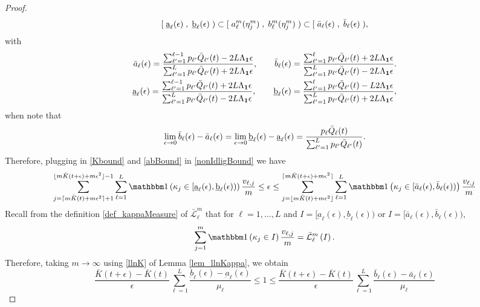 \documentclass{article}
\theoremstyle{definition}
\numberwithin{equation}{section}
\begin{document}
\begin{proof}
\begin{equation}
[\;\underbar a_\ell(\epsilon)\;,\;\underbar b_\ell(\epsilon)\;) \subset [\;a^m_\ell(\eta^m_j)\;,\;b^m_\ell(\eta^m_j)\;) \subset [\;\bar a_\ell(\epsilon)\;,\;\bar b_\ell(\epsilon)\;),
\end{equation}
with
\begin{align*}
  \bar a_\ell(\epsilon)= \frac{\sum_{\ell'=1}^{\ell-1 }\weight_{\ell'}\bar Q_{\ell'}(t)-2L\Lip_\f1\epsilon}{\sum_{\ell'=1}^{L}\weight_{\ell'}\bar Q_{\ell'}(t)+2L\Lip_\f1\epsilon},\quad\quad \bar b_\ell(\epsilon)= \frac{\sum_{\ell'=1}^{\ell }\weight_{\ell'}\bar Q_{\ell'}(t)+2L\Lip_\f1\epsilon}{\sum_{\ell'=1}^{L}\weight_{\ell'}\bar Q_{\ell'}(t)-2L\Lip_\f1\epsilon}.\\
  \underbar a_\ell(\epsilon)= \frac{\sum_{\ell'=1}^{\ell-1 }\weight_{\ell'}\bar Q_{\ell'}(t)+2L\Lip_\f1\epsilon}{\sum_{\ell'=1}^{L}\weight_{\ell'}\bar Q_{\ell'}(t)-2L\Lip_\f1\epsilon},\quad\quad
  \underbar b_\ell(\epsilon)= \frac{\sum_{\ell'=1}^{\ell }\weight_{\ell'}\bar Q_{\ell'}(t)-L2\Lip_\f1\epsilon}{\sum_{\ell'=1}^{L}\weight_{\ell'}\bar Q_{\ell'}(t)+2L\Lip_\f1\epsilon},
\end{align*}
when note that
\begin{equation}\label{ablimit}
  \lim_{\epsilon\to0} \bar b_\ell(\epsilon)-\bar a_\ell(\epsilon) =\lim_{\epsilon\to0} \underbar b_\ell(\epsilon)-\underbar a_\ell(\epsilon) = \frac{p_{\ell}\bar Q_{\ell}(t)}{\sum_{\ell'=1}^{L}p_{\ell'}\bar Q_{\ell'}(t)}.
\end{equation}
Therefore, plugging in \eqref{Kbound} and \eqref{abBound} in \eqref{nonIdligBound} we have
\[
  \sum_{j=\lceil m\bar K(t)+ m\epsilon^2\rceil+1}^{\lfloor m \bar K(t+\epsilon)+ m\epsilon^2\rfloor -1}\sum_{\ell=1}^{L}\indic{\selector_j\in [\underbar a_\ell(\epsilon),\underbar b_\ell(\epsilon))}\frac{v_{\ell,j}}{m}
  \leq \epsilon
  \leq \sum_{j=\lfloor m\bar K(t)+ m\epsilon^2\rfloor}^{\lceil m \bar K(t+\epsilon)+ m\epsilon^2\rceil}\sum_{\ell=1}^{L}\indic{\selector_j\in [\bar a_\ell(\epsilon),\bar b_\ell(\epsilon))}\frac{v_{\ell,j}}{m}
\]
Recall from the definition \eqref{def_kappaMeasure} of $\bar{\mathcal{L}}_\ell^m$ that for $\ell=1,...,L$ and $I=[\underbar a_\ell(\epsilon),\underbar b_\ell(\epsilon))$ or $I= [\bar a_\ell(\epsilon),\bar b_\ell(\epsilon))$,
\[
\sum_{j=1}^m \indic{\selector_j\in I}\frac{v_{\ell,j}}{m} = \bar{\mathcal{L}}_\ell^m \left(I\right).
\]
Therefore, taking $m\to\infty$ using \eqref{llnK} of Lemma \ref{lem_llnKappa}, we obtain
\begin{equation}
  \frac{\bar K(t+\epsilon)-\bar K(t)}{\epsilon} \sum_{\ell=1}^{L}\frac{\underbar b_\ell(\epsilon)-\underbar a_\ell(\epsilon)}{\mu_\ell}\leq 1 \leq \frac{\bar K(t+\epsilon)-\bar K(t)}{\epsilon} \sum_{\ell=1}^{L}\frac{\bar b_\ell(\epsilon)-\bar a_\ell(\epsilon)}{\mu_\ell}

\end{equation}
\end{proof}
\end{document}
